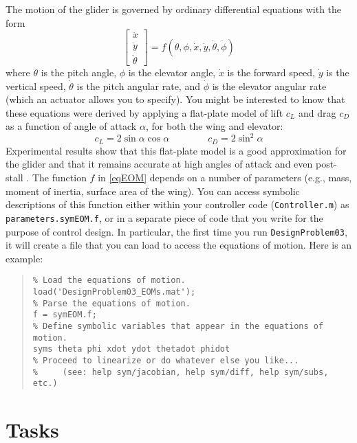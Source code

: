 \documentclass[12pt]{article}
\begin{document}
The motion of the glider is governed by ordinary differential equations with the form
\begin{equation}
\label{eqEOM}
\begin{bmatrix} \ddot{x} \\ \ddot{y} \\ \ddot{\theta} \end{bmatrix} = f(\theta,\phi,\dot{x},\dot{y},\dot{\theta},\dot{\phi})
\end{equation}
where $\theta$ is the pitch angle, $\phi$ is the elevator angle, $\dot{x}$ is the forward speed, $\dot{y}$ is the vertical speed, $\dot{\theta}$ is the pitch angular rate, and $\dot{\phi}$ is the elevator angular rate (which an actuator allows you to specify). You might be interested to know that these equations were derived by applying a flat-plate model of lift $c_{L}$ and drag $c_{D}$ as a function of angle of attack $\alpha$, for both the wing and elevator:
\begin{equation*}
c_{L} = 2\sin\alpha \cos\alpha
\qquad\qquad
c_{D} = 2\sin^{2}\alpha
\end{equation*}
Experimental results show that this flat-plate model is a good approximation for the glider and that it remains accurate at high angles of attack and even post-stall \cite{Moore2014}. The function $f$ in \eqref{eqEOM} depends on a number of parameters (e.g., mass, moment of inertia, surface area of the wing). You can access symbolic descriptions of this function either within your controller code (\lstinline|Controller.m|) as \lstinline|parameters.symEOM.f|, or in a separate piece of code that you write for the purpose of control design. In particular, the first time you run \lstinline|DesignProblem03|, it will create a file that you can load to access the equations of motion. Here is an example:
\begin{quote}
\begin{lstlisting}
% Load the equations of motion.
load('DesignProblem03_EOMs.mat');
% Parse the equations of motion.
f = symEOM.f;
% Define symbolic variables that appear in the equations of motion.
syms theta phi xdot ydot thetadot phidot
% Proceed to linearize or do whatever else you like...
%     (see: help sym/jacobian, help sym/diff, help sym/subs, etc.)
\end{lstlisting}
\end{quote}


\section{Tasks}
\end{document}
